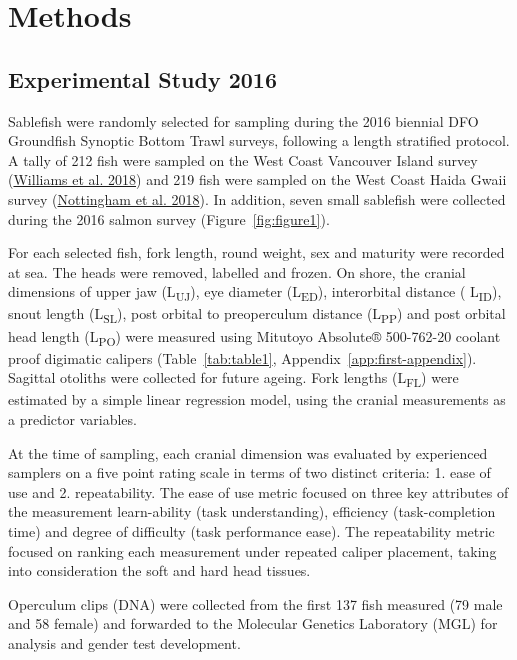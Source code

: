 \documentclass[12pt]{article}\usepackage[]{graphicx}\usepackage[]{color}
\begin{document}
\hypertarget{methods}{%
\section{Methods}\label{methods}}

\hypertarget{experimental-study-2016}{%
\subsection{Experimental Study 2016}\label{experimental-study-2016}}

Sablefish were randomly selected for sampling during the 2016 biennial DFO Groundfish Synoptic Bottom Trawl surveys, following a length stratified protocol. A tally of 212 fish were sampled on the West Coast Vancouver Island survey (\protect\hyperlink{ref-Williams2018}{Williams et al. 2018}) and 219 fish were sampled on the West Coast Haida Gwaii survey (\protect\hyperlink{ref-Nottingham2018}{Nottingham et al. 2018}). In addition, seven small sablefish were collected during the 2016 salmon survey (Figure~\ref{fig:figure1}).

For each selected fish, fork length, round weight, sex and maturity were recorded at sea. The heads were removed, labelled and frozen. On shore, the cranial dimensions of upper jaw (L\textsubscript{UJ}), eye diameter (L\textsubscript{ED}), interorbital distance ( L\textsubscript{ID}), snout length (L\textsubscript{SL}), post orbital to preoperculum distance (L\textsubscript{PP}) and post orbital head length (L\textsubscript{PO}) were measured using Mitutoyo Absolute® 500-762-20 coolant proof digimatic calipers (Table~\ref{tab:table1}, Appendix~\ref{app:first-appendix}). Sagittal otoliths were collected for future ageing. Fork lengths (L\textsubscript{FL}) were estimated by a simple linear regression model, using the cranial measurements as a predictor variables.

At the time of sampling, each cranial dimension was evaluated by experienced samplers on a five point rating scale in terms of two distinct criteria: 1. ease of use and 2. repeatability. The ease of use metric focused on three key attributes of the measurement learn-ability (task understanding), efficiency (task-completion time) and degree of difficulty (task performance ease). The repeatability metric focused on ranking each measurement under repeated caliper placement, taking into consideration the soft and hard head tissues.

Operculum clips (DNA) were collected from the first 137 fish measured (79 male and 58 female) and forwarded to the Molecular Genetics Laboratory (MGL) for analysis and gender test development.
\end{document}
